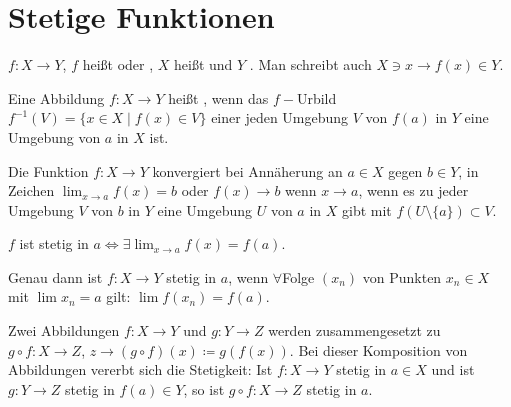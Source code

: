 \chapter{Stetige Funktionen}
$ f\colon X\rightarrow Y $, $ f $ hei\ss t  oder , $ X $ hei\ss t  und $ Y $ . Man schreibt auch $ X\ni x\rightarrow f(x)\in Y $.\\
\begin{definition}
Eine Abbildung $ f\colon X\rightarrow Y $ hei\ss t , wenn das $ f- $Urbild $ f^{-1}(V)=\lbrace x\in X\mid f(x)\in V\rbrace $ einer jeden Umgebung $ V $ von $ f(a) $ in $ Y $ eine Umgebung von $ a $ in $ X $ ist.
\end{definition}
\begin{definition}
Die Funktion $ f\colon X\rightarrow Y $ konvergiert bei Ann\"aherung an $ a\in X $ gegen $ b\in Y $, in Zeichen $ \lim_{x\to a} f(x)=b $ oder $ f(x)\rightarrow b $ wenn $ x\rightarrow a $, wenn es zu jeder Umgebung $ V $ von $ b $ in $ Y $ eine Umgebung $ U $ von $ a $ in $ X $ gibt mit $ f(U\setminus\lbrace a\rbrace)\subset V $.
\end{definition}
\begin{bemerkung*}
$ f $ ist stetig in $ a\Leftrightarrow\exists\lim_{x\to a}f(x)=f(a) $.
\end{bemerkung*}
\begin{satz}[Folgenkriterium]
Genau dann ist $ f\colon X\rightarrow Y $ stetig in $ a $, wenn $ \forall $Folge $ (x_n) $ von Punkten $ x_n\in X $ mit $ \lim x_n=a $ gilt: $ \lim f(x_n)=f(a) $.
\end{satz}
Zwei Abbildungen $ f\colon X\rightarrow Y $ und $ g\colon Y\rightarrow Z $ werden zusammengesetzt zu $ g\circ f\colon X\rightarrow Z $, $ z\rightarrow (g\circ f)(x)\coloneqq g(f(x)) $. Bei dieser Komposition von Abbildungen vererbt sich die Stetigkeit: Ist $ f\colon X\rightarrow Y $ stetig in $ a\in X $ und ist $ g\colon Y\rightarrow Z $ stetig in $ f(a)\in Y $, so ist $ g\circ f\colon X\rightarrow Z $ stetig in $ a $.